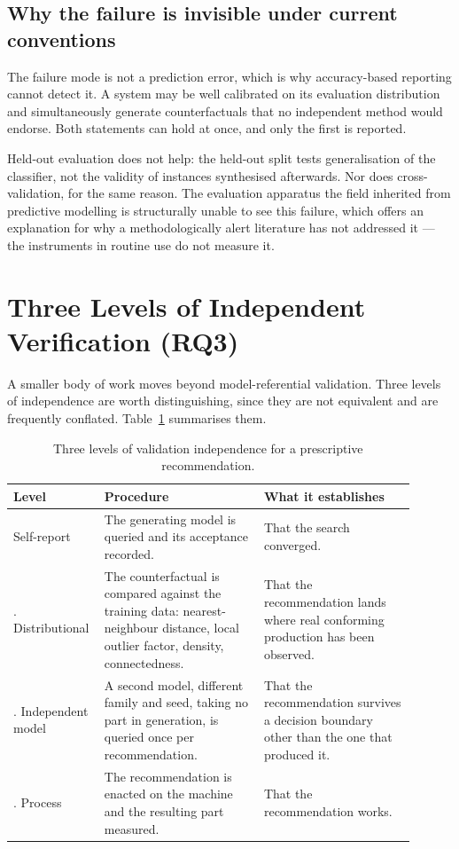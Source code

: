\documentclass[11pt,a4paper]{article}
\begin{document}
\subsection{Why the failure is invisible under current conventions}

The failure mode is not a prediction error, which is why accuracy-based reporting cannot detect it. A system may be well calibrated on its evaluation distribution and simultaneously generate counterfactuals that no independent method would endorse. Both statements can hold at once, and only the first is reported.

Held-out evaluation does not help: the held-out split tests generalisation of the classifier, not the validity of instances synthesised afterwards. Nor does cross-validation, for the same reason. The evaluation apparatus the field inherited from predictive modelling is structurally unable to see this failure, which offers an explanation for why a methodologically alert literature has not addressed it --- the instruments in routine use do not measure it.

\section{Three Levels of Independent Verification (RQ3)}\label{sec:levels}

A smaller body of work moves beyond model-referential validation. Three levels of independence are worth distinguishing, since they are not equivalent and are frequently conflated. Table~\ref{tab:levels} summarises them.

\begin{table}[htbp]
\centering
\caption{Three levels of validation independence for a prescriptive recommendation.}
\label{tab:levels}
\small
\begin{tabular}{@{}p{0.16\linewidth}p{0.38\linewidth}p{0.36\linewidth}@{}}
\toprule
\textbf{Level} & \textbf{Procedure} & \textbf{What it establishes} \\
\midrule
Self-report & The generating model is queried and its acceptance recorded. & That the search converged. \\
\addlinespace
1. Distributional & The counterfactual is compared against the training data: nearest-neighbour distance, local outlier factor, density, connectedness. & That the recommendation lands where real conforming production has been observed. \\
\addlinespace
2. Independent model & A second model, different family and seed, taking no part in generation, is queried once per recommendation. & That the recommendation survives a decision boundary other than the one that produced it. \\
\addlinespace
3. Process & The recommendation is enacted on the machine and the resulting part measured. & That the recommendation works. \\
\bottomrule
\end{tabular}
\end{table}
\end{document}
